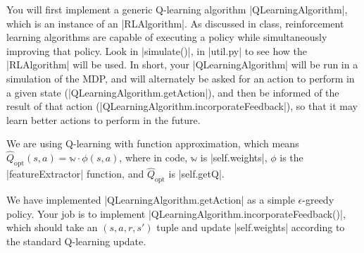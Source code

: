 \item {}
You will first implement a generic Q-learning algorithm |QLearningAlgorithm|,
which is an instance of an |RLAlgorithm|.  As discussed in class, reinforcement
learning algorithms are capable of executing a policy while simultaneously
improving that policy.  Look in |simulate()|, in |util.py| to see how the
|RLAlgorithm| will be used.  In short, your |QLearningAlgorithm| will be run in
a simulation of the MDP, and will alternately be asked for an action to perform
in a given state (|QLearningAlgorithm.getAction|), and then be informed of the
result of that action (|QLearningAlgorithm.incorporateFeedback|), so that it may
learn better actions to perform in the future.

We are using Q-learning with function approximation, which means
$\hat Q_\text{opt}(s, a) = \mathbb w \cdot \phi(s, a)$, where in code,
$\mathbb w$ is |self.weights|, $\phi$ is the |featureExtractor| function, and
$\hat Q_\text{opt}$ is |self.getQ|.

We have implemented |QLearningAlgorithm.getAction| as a simple $\epsilon$-greedy
policy. Your job is to implement |QLearningAlgorithm.incorporateFeedback()|,
which should take an $(s, a, r, s')$ tuple and update |self.weights| according
to the standard Q-learning update.
